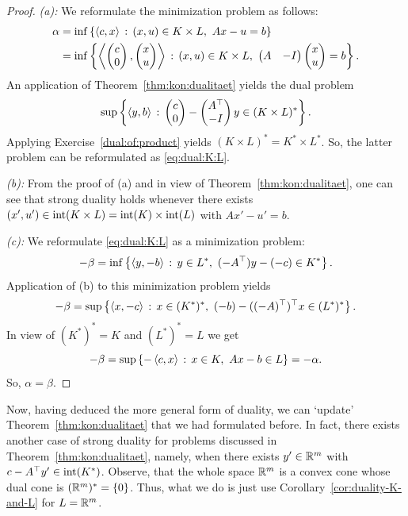 \begin{proof} 
	\emph{(a):} We reformulate the minimization problem as follows:
	\begin{align*}
		\alpha & = \inf \left\{  \left\langle c , x \right\rangle  \,:\,  (x,u) \in K \times L, \ A x - u = b \right\}
		\\ & = \inf \left\{  \left\langle \begin{pmatrix} c \\ 0 \end{pmatrix}  ,  \begin{pmatrix} x \\ u \end{pmatrix}  \right\rangle  \,:\,  (x,u) \in K \times L, \ \begin{pmatrix} A & -I \end{pmatrix} \begin{pmatrix} x \\ u \end{pmatrix} = b \right\}.
	\end{align*}
	An application of Theorem~\ref{thm:kon:dualitaet} yields the dual problem
	\[
		\sup \left\{ \left\langle y , b \right\rangle \,:\,  \begin{pmatrix}c\\ 0 \end{pmatrix} - \begin{pmatrix} A^\top \\ - I \end{pmatrix} y  \in (K \times L)^\ast \right\}.
	\]
	Applying Exercise~\ref{dual:of:product} yields $(K \times L)^\ast = K^\ast \times L^\ast$.
	 So, the latter problem can be reformulated as \eqref{eq:dual:K:L}.
	 
	\emph{(b):} From the proof of (a) and in view of  Theorem~\ref{thm:kon:dualitaet}, one can see that strong duality holds whenever there exists $(x',u') \in \operatorname{int}(K \times L) = \operatorname{int}(K) \times \operatorname{int}(L)$ with $Ax' - u' =b$.

	\emph{(c):} We reformulate \eqref{eq:dual:K:L} as a minimization problem:
	\[
		-\beta = \inf \left\{ \left\langle y , -b \right\rangle \,:\, y \in L^\ast, \ (-A^\top) y - (-c) \in K^\ast \right\}.
	\]
	Application of (b) to this minimization problem yields
	\[
		- \beta = \sup \left\{ \left\langle x , -c \right\rangle \,:\, x \in (K^\ast)^\ast,  \ (-b) - ((-A)^\top)^\top x  \in (L^\ast)^\ast  \right\}.
	\]
	In view of $(K^\ast)^\ast = K$ and $(L^\ast)^\ast = L$ we get
	\[
		- \beta = \sup \left\{  - \left\langle c , x \right\rangle  \,:\, x \in K, \ A x - b \in L \right\} = - \alpha.
	\]
	So, $\alpha = \beta$. 
\end{proof}

\begin{remark}
	Now, having deduced the more general form of duality, we can `update'  Theorem~\ref{thm:kon:dualitaet} that we had formulated before. In fact, there exists another case of strong duality for problems discussed in Theorem~\ref{thm:kon:dualitaet}, namely, when there exists $y' \in \mathbb{R}^m$ with $c - A^\top y'\in \operatorname{int}(K^\ast)$. Observe, that the whole space $\mathbb{R}^m$ is a convex cone whose dual cone is $(\mathbb{R}^m)^\ast = \{0\}$. Thus, what we do is just use Corollary~\ref{cor:duality-K-and-L} for $L = \mathbb{R}^m$. 
\end{remark} 

